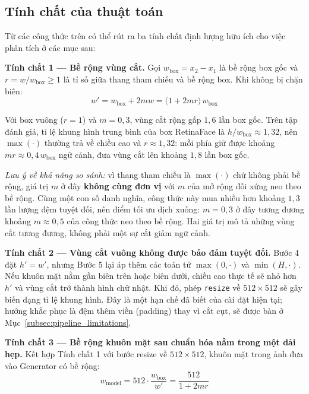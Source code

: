 \subsection{Tính chất của thuật toán}
\label{subsec:margin_properties}

Từ các công thức trên có thể rút ra ba tính chất định lượng hữu ích cho việc phân tích ở các mục sau:

\textbf{Tính chất 1 --- Bề rộng vùng cắt.} Gọi $w_{\text{box}} = x_2 - x_1$ là bề rộng box gốc và $r = w / w_{\text{box}} \geq 1$ là tỉ số giữa thang tham chiếu và bề rộng box. Khi không bị chặn biên:
\begin{equation}
\label{eq:crop_width}
w' = w_{\text{box}} + 2 m w = \big(1 + 2 m r\big)\, w_{\text{box}}
\end{equation}

Với box vuông ($r = 1$) và $m = 0{,}3$, vùng cắt rộng gấp $1{,}6$ lần box gốc. Trên tập đánh giá, tỉ lệ khung hình trung bình của box RetinaFace là $h / w_{\text{box}} \approx 1{,}32$, nên $\max(\cdot)$ thường trả về chiều cao và $r \approx 1{,}32$: mỗi phía giữ được khoảng $m r \approx 0{,}4\, w_{\text{box}}$ ngữ cảnh, đưa vùng cắt lên khoảng $1{,}8$ lần box gốc.

\medskip
\noindent\textit{Lưu ý về khả năng so sánh:} vì thang tham chiếu là $\max(\cdot)$ chứ không phải bề rộng, giá trị $m$ ở đây \textbf{không cùng đơn vị} với $m$ của mở rộng đối xứng neo theo bề rộng. Cùng một con số danh nghĩa, công thức này mua nhiều hơn khoảng $1{,}3$ lần lượng đệm tuyệt đối, nên điểm tối ưu dịch xuống: $m = 0{,}3$ ở đây tương đương khoảng $m \approx 0{,}5$ của công thức neo theo bề rộng. Hai giá trị mô tả những vùng cắt tương đương, không phải một sự cắt giảm ngữ cảnh.

\textbf{Tính chất 2 --- Vùng cắt vuông không được bảo đảm tuyệt đối.} Bước 4 đặt $h' = w'$, nhưng Bước 5 lại áp thêm các toán tử $\max(0,\cdot)$ và $\min(H,\cdot)$. Nếu khuôn mặt nằm gần biên trên hoặc biên dưới, chiều cao thực tế sẽ nhỏ hơn $h'$ và vùng cắt trở thành hình chữ nhật. Khi đó, phép \texttt{resize} về $512\times512$ sẽ gây biến dạng tỉ lệ khung hình. Đây là một hạn chế đã biết của cài đặt hiện tại; hướng khắc phục là đệm thêm viền (padding) thay vì cắt cụt, sẽ được bàn ở Mục~\ref{subsec:pipeline_limitations}.

\textbf{Tính chất 3 --- Bề rộng khuôn mặt sau chuẩn hóa nằm trong một dải hẹp.} Kết hợp Tính chất 1 với bước resize về $512\times512$, khuôn mặt trong ảnh đưa vào Generator có bề rộng:
\begin{equation}
\label{eq:face_width_after}
w_{\text{model}} = 512 \cdot \frac{w_{\text{box}}}{w'} = \frac{512}{1 + 2 m r}
\end{equation}

